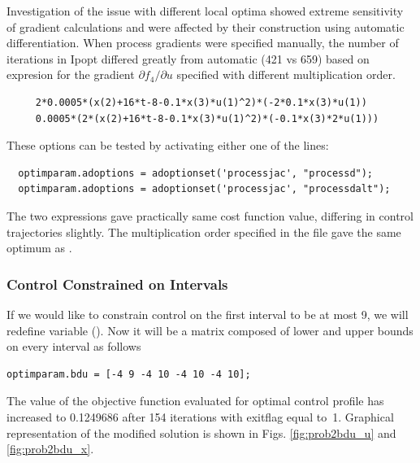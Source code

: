 Investigation of the issue with different local optima showed extreme
sensitivity of gradient calculations and were affected by their
construction using automatic differentiation. When process gradients
were specified manually, the number of iterations in Ipopt differed
greatly from automatic (421 vs 659) based on expresion for the
gradient $\partial f_4/\partial u$ specified with different
multiplication order.
\begin{verbatim}
     2*0.0005*(x(2)+16*t-8-0.1*x(3)*u(1)^2)*(-2*0.1*x(3)*u(1))
     0.0005*(2*(x(2)+16*t-8-0.1*x(3)*u(1)^2)*(-0.1*x(3)*2*u(1)))
\end{verbatim}
These options can be tested by activating either one of the lines:
\begin{verbatim}
  optimparam.adoptions = adoptionset('processjac', "processd");
  optimparam.adoptions = adoptionset('processjac', "processdalt");
\end{verbatim}
The two expressions gave practically same cost function value,
differing in control trajectories slightly. The multiplication order
specified in the file  gave the same optimum as
.
\subsubsection{Control Constrained on Intervals}
If we would like to constrain control on the first interval to be at
most 9, we will redefine variable 
().  Now it will be a matrix composed
of lower and upper bounds on every interval as follows
\begin{verbatim}
optimparam.bdu = [-4 9 -4 10 -4 10 -4 10]; 
\end{verbatim}

The value of the objective function evaluated for optimal control
profile has increased to 0.1249686 after 154 iterations with exitflag
equal to~1. Graphical representation of the modified solution is shown
in Figs. \ref{fig:prob2bdu_u} and \ref{fig:prob2bdu_x}.

